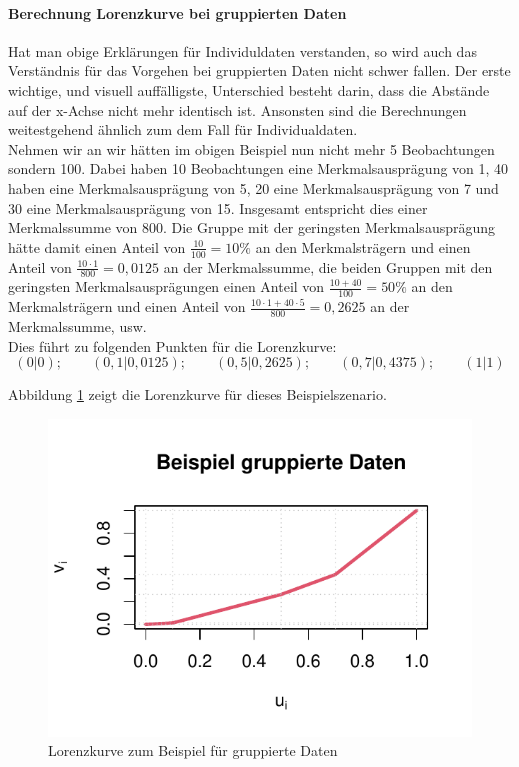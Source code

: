 \documentclass[a4paper]{article}
\begin{document}
\paragraph{Berechnung Lorenzkurve bei gruppierten Daten}
Hat man obige Erklärungen für Individuldaten verstanden, so wird auch das Verständnis für das Vorgehen bei gruppierten Daten nicht schwer fallen. Der erste wichtige, und visuell auffälligste, Unterschied besteht darin, dass die Abstände auf der x-Achse nicht mehr identisch ist. Ansonsten sind die Berechnungen weitestgehend ähnlich zum dem Fall für Individualdaten.\\
Nehmen wir an wir hätten im obigen Beispiel nun nicht mehr 5 Beobachtungen sondern 100. Dabei haben 10 Beobachtungen eine Merkmalsausprägung von 1, 40 haben eine Merkmalsausprägung von 5, 20 eine Merkmalsausprägung von 7 und 30 eine Merkmalsausprägung von 15. Insgesamt entspricht dies einer Merkmalssumme von 800. Die Gruppe mit der geringsten Merkmalsausprägung hätte damit einen Anteil von $\frac{10}{100} = 10\%$ an den Merkmalsträgern und einen Anteil von $\frac{10 \cdot 1}{800} = 0,0125$ an der Merkmalssumme, die beiden Gruppen mit den geringsten  Merkmalsausprägungen einen Anteil von $\frac{10 + 40}{100} = 50\%$ an den Merkmalsträgern und einen Anteil von $\frac{10 \cdot 1 + 40 \cdot 5}{800} = 0,2625$ an der Merkmalssumme, usw.\\Dies führt zu folgenden Punkten für die Lorenzkurve:
$$(0|0);\qquad(0,1|0,0125);\qquad (0,5|0,2625);\qquad (0,7|0,4375);\qquad (1|1)$$

\noindent Abbildung \ref{fig:lk2} zeigt die Lorenzkurve für dieses Beispielszenario.
\begin{figure}[htbp]
    \centering
\includegraphics[width = .7\textwidth]{figures/example_lc2.pdf}
    \caption{Lorenzkurve zum Beispiel für gruppierte Daten}
    \label{fig:lk2}
\end{figure}
\end{document}
